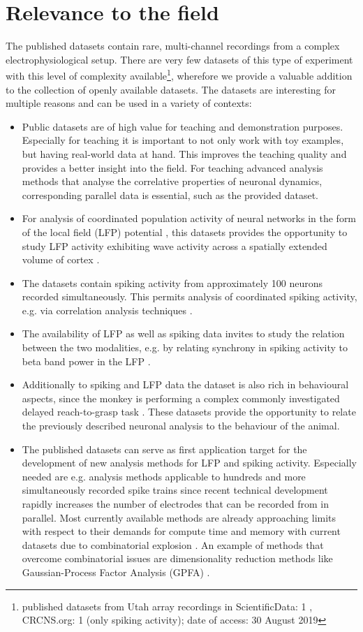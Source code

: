 \section{Relevance to the field}
The published datasets contain rare, multi-channel recordings from a complex electrophysiological setup. There are very few datasets of this type of experiment with this level of complexity available\footnote{published datasets from Utah array recordings in ScientificData: 1 \citep{Brochier_2018}, CRCNS.org: 1 (only spiking activity); date of access: 30 August 2019}, wherefore we provide a valuable addition to the collection of openly available datasets. The datasets are interesting for multiple reasons and can be used in a variety of contexts:
\begin{itemize}
 \item Public datasets are of high value for teaching and demonstration purposes. Especially for teaching it is important to not only work with toy examples, but having real-world data at hand. This improves the teaching quality and provides a better insight into the field. For teaching advanced analysis methods that analyse the correlative properties of neuronal dynamics, corresponding parallel data is essential, such as the provided dataset.
 \item For analysis of coordinated population activity of neural networks in the form of the local field (LFP) potential \citep{Mitzdorf_1985, Logothetis_2004, Einevoll_2013}, this datasets provides the opportunity to study LFP activity exhibiting wave activity across a spatially extended volume of cortex \citep{Denker_2018}.
 \item The datasets contain spiking activity from approximately 100 neurons recorded simultaneously. This permits analysis of coordinated spiking activity, e.g. via correlation analysis techniques \citep{Torre_2016, Torre_2016a, Quaglio_2017, Quaglio_2018}.
 \item The availability of LFP as well as spiking data invites to study the relation between the two modalities, e.g. by relating synchrony in spiking activity to beta band power in the LFP \citep{Denker_2011}.
 \item Additionally to spiking and LFP data the dataset is also rich in behavioural aspects, since the monkey is performing a complex commonly investigated delayed reach-to-grasp task \citep{Smeets_2019,Runnarong_2019}. These datasets provide the opportunity to relate the previously described neuronal analysis to the behaviour of the animal.
 \item The published datasets can serve as first application target for the development of new analysis methods for LFP and spiking activity. Especially needed are e.g. analysis methods applicable to hundreds and more simultaneously recorded spike trains since recent technical development rapidly increases the number of electrodes that can be recorded from in parallel. Most currently available methods are already approaching limits with respect to their demands for compute time and memory with current datasets due to combinatorial explosion \citep{Seo_2015,Jun_2017}. An example of methods that overcome combinatorial issues are dimensionality reduction methods like Gaussian-Process Factor Analysis (GPFA) \citep{Yu_2009}. 

\end{itemize}
